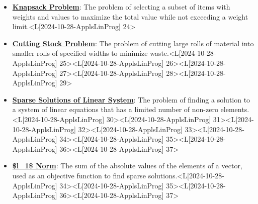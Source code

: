 \documentclass{article}%
\begin{document}
\begin{itemize}[[leftmargin=*]]
\item \href{https://www.math.purdue.edu/~yipn/421/2024-10-28-ApplsLinProg.pdf#page=24}{\textbf{Knapsack Problem}}: The problem of selecting a subset of items with weights and values to maximize the total value while not exceeding a weight limit.<L[2024-10-28-ApplsLinProg] 24>%
\item \href{https://www.math.purdue.edu/~yipn/421/2024-10-28-ApplsLinProg.pdf#page=25}{\textbf{Cutting Stock Problem}}: The problem of cutting large rolls of material into smaller rolls of specified widths to minimize waste.<L[2024-10-28-ApplsLinProg] 25><L[2024-10-28-ApplsLinProg] 26><L[2024-10-28-ApplsLinProg] 27><L[2024-10-28-ApplsLinProg] 28><L[2024-10-28-ApplsLinProg] 29>%
\item \href{https://www.math.purdue.edu/~yipn/421/2024-10-28-ApplsLinProg.pdf#page=30}{\textbf{Sparse Solutions of Linear System}}: The problem of finding a solution to a system of linear equations that has a limited number of non-zero elements.<L[2024-10-28-ApplsLinProg] 30><L[2024-10-28-ApplsLinProg] 31><L[2024-10-28-ApplsLinProg] 32><L[2024-10-28-ApplsLinProg] 33><L[2024-10-28-ApplsLinProg] 34><L[2024-10-28-ApplsLinProg] 35><L[2024-10-28-ApplsLinProg] 36><L[2024-10-28-ApplsLinProg] 37>%
\item \href{https://www.math.purdue.edu/~yipn/421/2024-10-28-ApplsLinProg.pdf#page=34}{\textbf{\$l\_1\$ Norm}}: The sum of the absolute values of the elements of a vector, used as an objective function to find sparse solutions.<L[2024-10-28-ApplsLinProg] 34><L[2024-10-28-ApplsLinProg] 35><L[2024-10-28-ApplsLinProg] 36><L[2024-10-28-ApplsLinProg] 37>%
\end{itemize}%
\end{document}
